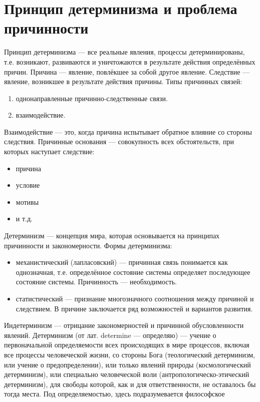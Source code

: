 \documentclass[12pt]{article}
\begin{document}
\section{Принцип детерминизма и проблема причинности}
Принцип  детерминизма --- все реальные явления, процессы детерминированы, т.е. возникают,  развиваются и
уничтожаются в результате действия определённых причин. Причина --- явление,  повлёкшее за собой другое
явление.  Следствие --- явление,  возникшее в результате   действия  причины.
Типы  причинных  связей:
\begin{enumerate}
  \item однонаправленные  причинно-следственные   связи.
  \item  взаимодействие.
\end{enumerate} 
Взаимодействие --- это,  когда  причина
испытывает обратное влияние со стороны следствия. 
Причинные основания --- совокупность всех обстоятельств,
при которых наступает следствие:
\begin{itemize}
  \item причина 
  \item условие 
  \item мотивы 
  \item и т.д.
\end{itemize}
Детерминизм --- концепция мира, которая
основывается  на  принципах  причинности  и  закономерности.
Формы  детерминизма:
\begin{itemize}
  \item   механистический
(лапласовский)  ---  причинная  связь  понимается  как  однозначная,  т.е.   определённое  состояние  системы
определяет  последующее  состояние  системы. Причинность ---  необходимость.
\item  статистический  ---  признание
многозначного  соотношения  между  причиной   и  следствием. В  причине  заключается  ряд  возможностей  и
вариантов развития.
\end{itemize}
Индетерминизм --- отрицание закономерностей и причинной обусловленности явлений.
Детерминизм (от лат. determine — определяю) — учение о первоначальной определяемости всех происходящих
в мире процессов, включая все процессы человеческой жизни, со стороны Бога (теологический детерминизм,
или учение о предопределении), или только явлений природы (космологический детерминизм), или специально
человеческой  воли  (антропологическо-этический  детерминизм),  для  свободы  которой,  как  и  для
ответственности, не оставалось бы тогда места. Под определяемостью, здесь подразумевается философское
\end{document}
